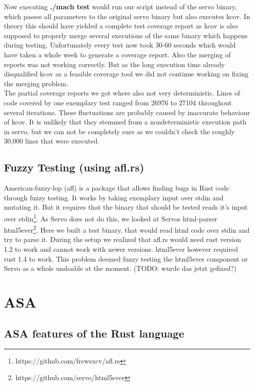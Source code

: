 \documentclass{scrartcl}
\newcommand{\todo}[1] {{\color{red}(TODO: #1)}}
\begin{document}
Now executing \textbf{./mach test} would run our script instead of the servo binary, which passes all parameters to the original servo binary but also executes kcov. In theory this should have yielded a complete test coverage report as kcov is also supposed to properly merge several executions of the same binary which happens during testing. Unfortunately every test now took 30-60 seconds which would have taken a whole week to generate a coverage report. Also the merging of reports was not working correctly. But as the long execution time already disqualified kcov as a feasible coverage tool we did not continue working on fixing the merging problem.\\

The partial coverage reports we got where also not very deterministic. Lines of code covered by one exemplary test ranged from 26976 to 27104 throughout several iterations. These fluctuations are probably caused by inaccurate behaviour of kcov. It is unlikely that they stemmed from a nondeterministic execution path in servo, but we can not be completely sure as we couldn't check the roughly 30,000 lines that were executed.

\subsection{Fuzzy Testing (using afl.rs)}
American-fuzzy-lop (afl) is a package that allows finding bugs in Rust code through fuzzy testing. It works by taking exemplary input over stdin and mutating it. But it requires that the binary that should be tested reads it's input over stdin\footnote{https://github.com/frewsxcv/afl.rs}. As Servo does not do this, we looked at Servos html-parser html5ever\footnote{https://github.com/servo/html5ever}. Here we built a test binary, that would read html code over stdin and try to parse it. During the setup we realized that afl.rs would need rust version 1.2 to work and cannot work with newer versions. html5ever however required rust 1.4 to work. This problem deemed fuzzy testing the html5ever component or Servo as a whole undoable at the moment. \todo{wurde das jetzt gefixed?}




\section{ASA}



\subsection{ASA features of the Rust language} \label{rust_features}
\end{document}
